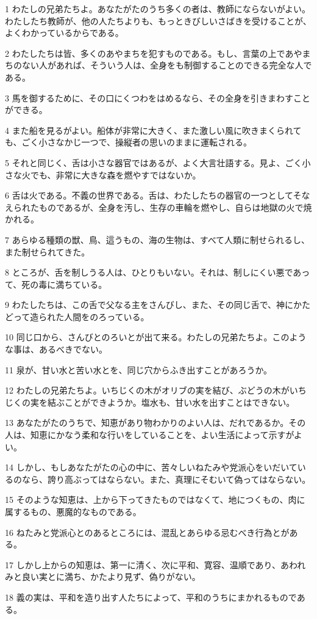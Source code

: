 \par 1 わたしの兄弟たちよ。あなたがたのうち多くの者は、教師にならないがよい。わたしたち教師が、他の人たちよりも、もっときびしいさばきを受けることが、よくわかっているからである。
\par 2 わたしたちは皆、多くのあやまちを犯すものである。もし、言葉の上であやまちのない人があれば、そういう人は、全身をも制御することのできる完全な人である。
\par 3 馬を御するために、その口にくつわをはめるなら、その全身を引きまわすことができる。
\par 4 また船を見るがよい。船体が非常に大きく、また激しい風に吹きまくられても、ごく小さなかじ一つで、操縦者の思いのままに運転される。
\par 5 それと同じく、舌は小さな器官ではあるが、よく大言壮語する。見よ、ごく小さな火でも、非常に大きな森を燃やすではないか。
\par 6 舌は火である。不義の世界である。舌は、わたしたちの器官の一つとしてそなえられたものであるが、全身を汚し、生存の車輪を燃やし、自らは地獄の火で焼かれる。
\par 7 あらゆる種類の獣、鳥、這うもの、海の生物は、すべて人類に制せられるし、また制せられてきた。
\par 8 ところが、舌を制しうる人は、ひとりもいない。それは、制しにくい悪であって、死の毒に満ちている。
\par 9 わたしたちは、この舌で父なる主をさんびし、また、その同じ舌で、神にかたどって造られた人間をのろっている。
\par 10 同じ口から、さんびとのろいとが出て来る。わたしの兄弟たちよ。このような事は、あるべきでない。
\par 11 泉が、甘い水と苦い水とを、同じ穴からふき出すことがあろうか。
\par 12 わたしの兄弟たちよ。いちじくの木がオリブの実を結び、ぶどうの木がいちじくの実を結ぶことができようか。塩水も、甘い水を出すことはできない。
\par 13 あなたがたのうちで、知恵があり物わかりのよい人は、だれであるか。その人は、知恵にかなう柔和な行いをしていることを、よい生活によって示すがよい。
\par 14 しかし、もしあなたがたの心の中に、苦々しいねたみや党派心をいだいているのなら、誇り高ぶってはならない。また、真理にそむいて偽ってはならない。
\par 15 そのような知恵は、上から下ってきたものではなくて、地につくもの、肉に属するもの、悪魔的なものである。
\par 16 ねたみと党派心とのあるところには、混乱とあらゆる忌むべき行為とがある。
\par 17 しかし上からの知恵は、第一に清く、次に平和、寛容、温順であり、あわれみと良い実とに満ち、かたより見ず、偽りがない。
\par 18 義の実は、平和を造り出す人たちによって、平和のうちにまかれるものである。

